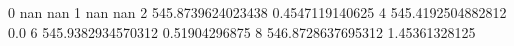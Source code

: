 0 nan nan
1 nan nan
2 545.8739624023438 0.4547119140625
4 545.4192504882812 0.0
6 545.9382934570312 0.51904296875
8 546.8728637695312 1.45361328125
